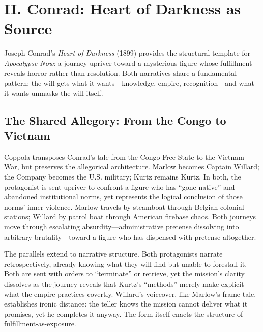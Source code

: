 \section*{II. Conrad: Heart of Darkness as Source}
\label{sec:ii-conrad}

Joseph Conrad's \textit{Heart of Darkness} (1899) provides the structural template for 
\textit{Apocalypse Now}: a journey upriver toward a mysterious figure whose fulfillment reveals 
horror rather than resolution. Both narratives share a fundamental pattern: the will gets what 
it wants---knowledge, empire, recognition---and what it wants unmasks the will itself.

\subsection*{The Shared Allegory: From the Congo to Vietnam}
\label{ssec:the-shared-allegory}
Coppola transposes Conrad's tale from the Congo Free State to the Vietnam War, but preserves 
the allegorical architecture. Marlow becomes Captain Willard; the Company becomes the U.S. 
military; Kurtz remains Kurtz. In both, the protagonist is sent upriver to confront a figure 
who has ``gone native'' and abandoned institutional norms, yet represents the logical 
conclusion of those norms' inner violence. Marlow travels by steamboat through Belgian colonial 
stations; Willard by patrol boat through American firebase chaos. Both journeys move through 
escalating absurdity—administrative pretense dissolving into arbitrary brutality—toward a 
figure who has dispensed with pretense altogether.

The parallels extend to narrative structure. Both protagonists narrate retrospectively, already 
knowing what they will find but unable to forestall it. Both are sent with orders to 
``terminate'' or retrieve, yet the mission's clarity dissolves as the journey reveals that 
Kurtz's ``methods'' merely make explicit what the empire practices covertly. Willard's 
voiceover, like Marlow's frame tale, establishes ironic distance: the teller knows the mission 
cannot deliver what it promises, yet he completes it anyway. The form itself enacts the 
structure of fulfillment-as-exposure.

